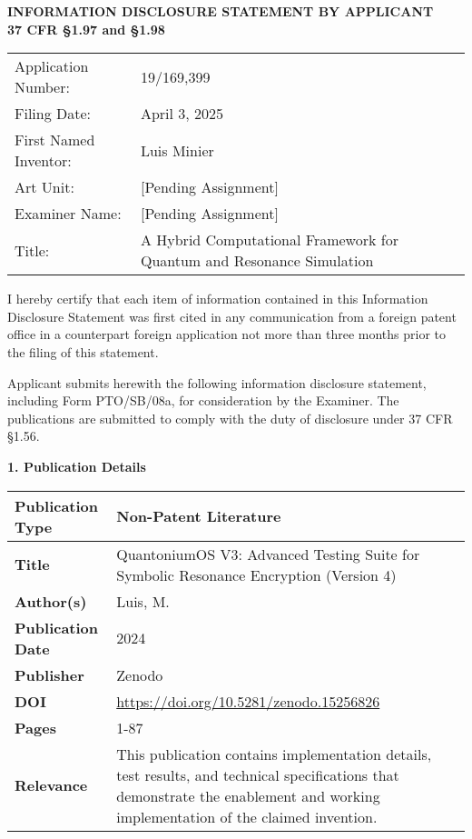 \documentclass[12pt,letterpaper]{article}
\newcommand{\papertitle}[1]{\noindent\begin{center}\textbf{#1}\end{center}}
\begin{document}
\begin{center}
\textbf{\large INFORMATION DISCLOSURE STATEMENT BY APPLICANT}\\
\vspace{0.25in}
\textbf{\large 37 CFR §1.97 and §1.98}\\
\vspace{0.5in}
\end{center}

\begin{tabular}{ll}
Application Number: & 19/169,399 \\
Filing Date: & April 3, 2025 \\
First Named Inventor: & Luis Minier \\
Art Unit: & [Pending Assignment] \\
Examiner Name: & [Pending Assignment] \\
Title: & A Hybrid Computational Framework for Quantum and Resonance Simulation \\
\end{tabular}

\vspace{0.5in}

\noindent I hereby certify that each item of information contained in this Information Disclosure Statement was first cited in any communication from a foreign patent office in a counterpart foreign application not more than three months prior to the filing of this statement.

\vspace{0.25in}

\noindent Applicant submits herewith the following information disclosure statement, including Form PTO/SB/08a, for consideration by the Examiner. The publications are submitted to comply with the duty of disclosure under 37 CFR §1.56.

\vspace{0.25in}

\papertitle{1. Publication Details}

\begin{longtable}{|p{1.5in}|p{4.5in}|}
\hline
\textbf{Publication Type} & Non-Patent Literature \\
\hline
\textbf{Title} & QuantoniumOS V3: Advanced Testing Suite for Symbolic Resonance Encryption (Version 4) \\
\hline
\textbf{Author(s)} & Luis, M. \\
\hline
\textbf{Publication Date} & 2024 \\
\hline
\textbf{Publisher} & Zenodo \\
\hline
\textbf{DOI} & \url{https://doi.org/10.5281/zenodo.15256826} \\
\hline
\textbf{Pages} & 1-87 \\
\hline
\textbf{Relevance} & This publication contains implementation details, test results, and technical specifications that demonstrate the enablement and working implementation of the claimed invention. \\
\hline
\end{longtable}
\end{document}
